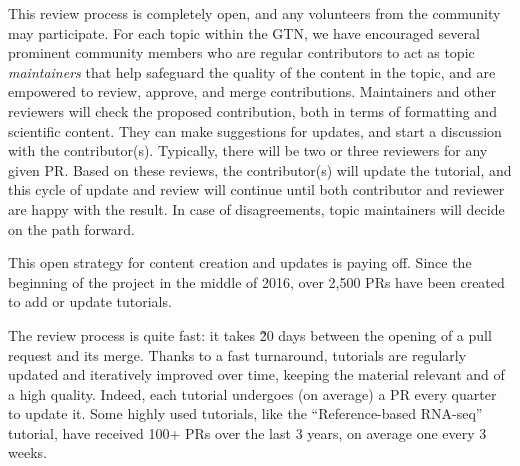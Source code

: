This review process is completely open, and any volunteers from the community may participate.
For each topic within the GTN, we have encouraged several prominent community members who are regular contributors to act as topic \emph{maintainers} that help safeguard the quality of the content in the topic, and are empowered to review, approve, and merge contributions.
Maintainers and other reviewers will check the proposed contribution, both in terms of formatting and scientific content. 
They can make suggestions for updates, and start a discussion with the contributor(s). 
Typically, there will be two or three reviewers for any given PR.
Based on these reviews, the contributor(s) will update the tutorial, and this cycle of update and review will continue until both contributor and reviewer are happy with the result. In case of disagreements, topic maintainers will decide on the path forward.

This open strategy for content creation and updates is paying off.
Since the beginning of the project in the middle of 2016, over 2,500 PRs have been created to add or update tutorials. %

The review process is quite fast: it takes \~20 days between the opening of a pull request and its merge. Thanks to a fast turnaround, tutorials are regularly updated and iteratively improved over time, keeping the material relevant and of a high quality. Indeed, each tutorial undergoes (on average) a PR every quarter to update it. Some highly used tutorials, like the ``Reference-based RNA-seq'' tutorial, have received 100+ PRs over the last 3 years, on average one every 3 weeks.


